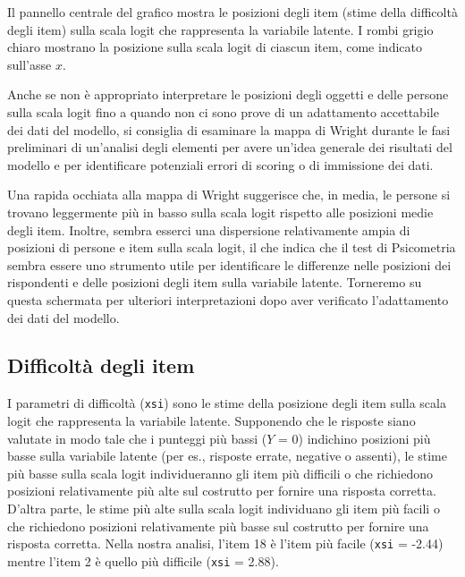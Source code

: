 Il pannello centrale del grafico mostra le posizioni degli item (stime della difficoltà degli item) sulla scala logit che rappresenta la variabile latente. 
I rombi grigio chiaro mostrano la posizione sulla scala logit di ciascun item, come indicato sull'asse $x$.

Anche se non è appropriato interpretare le posizioni degli oggetti e delle persone sulla scala logit fino a quando non ci sono prove di un adattamento accettabile dei dati del modello, si consiglia di esaminare la mappa di Wright durante le fasi preliminari di un'analisi degli elementi per avere un'idea generale dei risultati del modello e per identificare potenziali errori di scoring o di immissione dei dati.

Una rapida occhiata alla mappa di Wright suggerisce che, in media, le persone si trovano leggermente più in basso sulla scala logit rispetto alle posizioni medie degli item. 
Inoltre, sembra esserci una dispersione relativamente ampia di posizioni di persone e item sulla scala logit, il che indica che il test di Psicometria sembra essere uno strumento utile per identificare le differenze nelle posizioni dei rispondenti e delle posizioni degli item sulla variabile latente. 
Torneremo su questa schermata per ulteriori interpretazioni dopo aver verificato l'adattamento  dei dati del modello.

\subsection{Difficoltà degli item}

I parametri di difficoltà (\texttt{xsi}) sono le stime della posizione degli item sulla scala logit che rappresenta la variabile latente. 
Supponendo che le risposte siano valutate in modo tale che i punteggi più bassi ($Y$ = 0) indichino posizioni più basse sulla variabile latente (per es., risposte errate, negative o assenti), le stime più basse sulla scala logit individueranno gli item più difficili o che richiedono posizioni relativamente più alte sul costrutto per fornire una risposta corretta. 
D'altra parte, le stime più alte sulla scala logit individuano gli item più facili o che richiedono posizioni relativamente più basse sul costrutto per fornire una risposta corretta. 
Nella nostra analisi, l'item 18 è l'item più facile (\texttt{xsi} = -2.44) mentre l'item 2 è quello più difficile (\texttt{xsi} = 2.88).

